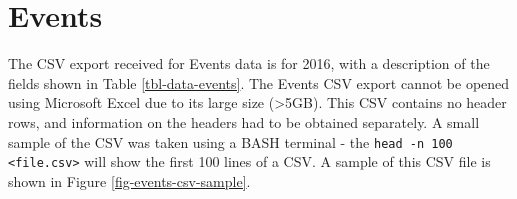 \section{Events}
The CSV export received for Events data is for 2016, with a description of the fields shown in  Table \ref{tbl-data-events}. The Events CSV export cannot be opened using Microsoft Excel due to its large size (\textgreater 5GB). This CSV contains no header rows, and information on the headers had to be obtained separately. A small sample of the CSV was taken using a BASH terminal - the \texttt{head -n 100 <file.csv>} will show the first 100 lines of a CSV. A sample of this CSV file is shown in Figure \ref{fig-events-csv-sample}.


